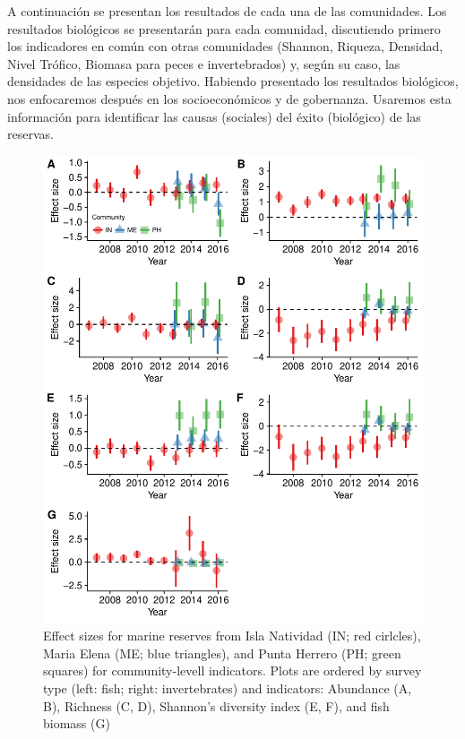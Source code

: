 \documentclass{frontiersSCNS}
\begin{document}
A continuación se presentan los resultados de cada una de las
comunidades. Los resultados biológicos se presentarán para cada
comunidad, discutiendo primero los indicadores en común con otras
comunidades (Shannon, Riqueza, Densidad, Nivel Trófico, Biomasa para
peces e invertebrados) y, según su caso, las densidades de las especies
objetivo. Habiendo presentado los resultados biológicos, nos enfocaremos
después en los socioeconómicos y de gobernanza. Usaremos esta
información para identificar las causas (sociales) del éxito (biológico)
de las reservas.

\begin{figure}
\centering
\includegraphics{Villasenor-Derbez_files/figure-latex/unnamed-chunk-3-1.pdf}
\caption{\label{fig:unnamed-chunk-3}\label{fig:indicators}Effect sizes for
marine reserves from Isla Natividad (IN; red cirlcles), Maria Elena (ME;
blue triangles), and Punta Herrero (PH; green squares) for
community-levell indicators. Plots are ordered by survey type (left:
fish; right: invertebrates) and indicators: Abundance (A, B), Richness
(C, D), Shannon's diversity index (E, F), and fish biomass (G)}
\end{figure}
\end{document}
